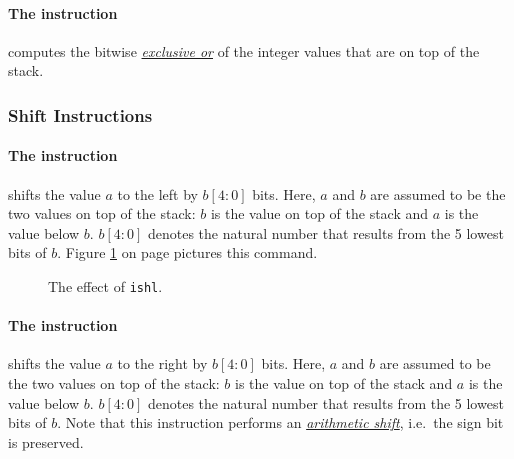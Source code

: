 \paragraph{The instruction }
computes the bitwise \href{http://en.wikipedia.org/wiki/Exclusive_or}{\emph{exclusive or}} of the integer values that are on top of the stack.

\subsubsection{Shift Instructions}

\paragraph{The instruction }
shifts the value $a$ to the left by $b[4:0]$ bits.  Here, $a$ and $b$ are assumed to be the two
values on top of the stack:  $b$ is the value on top of the stack and $a$ is the value below $b$.
$b[4:0]$ denotes the natural number that results from the 5 lowest bits of $b$.  Figure
\ref{fig:ijvm-shl} on page \pageref{fig:ijvm-shl} pictures this command.

\setlength{\unitlength}{0.5cm}
\begin{figure}[!ht]
  \centering
{}
  \caption{The effect of \texttt{ishl}.}
  \label{fig:ijvm-shl}
\end{figure}

\paragraph{The instruction }
shifts the value $a$ to the right by $b[4:0]$ bits.  Here, $a$ and $b$ are assumed to be the two
values on top of the stack:  $b$ is the value on top of the stack and $a$ is the value below $b$.
$b[4:0]$ denotes the natural number that results from the 5 lowest bits of $b$.  
Note that this instruction performs an 
\href{http://en.wikipedia.org/wiki/Arithmetic_shift}{\emph{arithmetic shift}}, 
i.e.~the sign bit is preserved.


